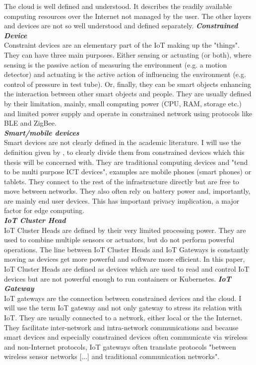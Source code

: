 The cloud is well defined and understood. It describes the readily available computing resources over the Internet not managed by the user. The other layers and devices are not so well understood and defined separately.
\textbf{\textit{Constrained Device}}\\
Constraint devices are an elementary part of the IoT making up the "things"\cite{contstraintDevicesTerminology}.
They can have three main purposes. Either sensing or actuating (or both), where sensing is the 
passive action of measuring the environment (e.g. a motion detector) and actuating is the active action of influencing the environment (e.g. control of pressure in test tube). Or, finally, they can be smart objects enhancing the interaction between other smart objects and people.
They are usually defined by their limitation, mainly, small computing power (CPU, RAM, storage etc.) and limited power supply and operate in constrained network using protocols like BLE and ZigBee. \\[5mm]
\textbf{\textit{Smart/mobile devices}}\\
Smart devices are not clearly defined in the academic literature. I will use the definition given by \citeauthor{poslad2011smartDevices}\cite{poslad2011smartDevices}, to clearly divide them from constrained devices which this thesis will be concerned with. They are traditional computing devices and "tend to be multi purpose ICT devices"\cite{poslad2011smartDevices}, examples are mobile phones (smart phones) or tablets. They connect to the rest of the infrastructure directly but are free to move between networks. They also often rely on battery power and, importantly, are mainly end user devices. This has important privacy implication, a major factor for edge computing.\\[5mm]
\textbf{\textit{IoT Cluster Head}}\\
IoT Cluster Heads are defined by their very limited processing power. They are used to combine multiple sensors or actuators, but do not perform powerful operations. The line between IoT Cluster Heads and IoT Gateways is constantly moving as devices get more powerful and software more efficient. In this paper, IoT Cluster Heads are defined as devices which are used to read and control IoT devices but are not powerful enough to run containers or Kubernetes.
\textbf{\textit{IoT Gateway}}\\
IoT gateways are the connection between constrained devices and the cloud. I will use the term IoT gateway and not only gateway to stress its relation with IoT. They are usually connected to a network, either local or the the Internet. They facilitate inter-network and intra-network communications and because smart devices and especially constrained devices often communicate via wireless and non-Internet protocols, IoT gateways often translate protocols "between wireless sensor networks [...] and traditional communication networks"\cite{zhu2010iotGatewayDefinition}.
